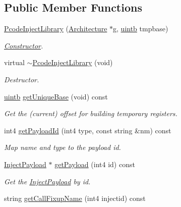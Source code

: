 \subsection*{Public Member Functions}
\begin{DoxyCompactItemize}
\item 
\mbox{\hyperlink{class_pcode_inject_library_a13fae9d7af655217a5612e4837d1f269}{Pcode\+Inject\+Library}} (\mbox{\hyperlink{class_architecture}{Architecture}} $\ast$g, \mbox{\hyperlink{types_8h_a2db313c5d32a12b01d26ac9b3bca178f}{uintb}} tmpbase)
\begin{DoxyCompactList}\small\item\em \mbox{\hyperlink{class_constructor}{Constructor}}. \end{DoxyCompactList}\item 
virtual \mbox{\hyperlink{class_pcode_inject_library_ae7a4417915e073736f49f698b95eb450}{$\sim$\+Pcode\+Inject\+Library}} (void)
\begin{DoxyCompactList}\small\item\em Destructor. \end{DoxyCompactList}\item 
\mbox{\hyperlink{types_8h_a2db313c5d32a12b01d26ac9b3bca178f}{uintb}} \mbox{\hyperlink{class_pcode_inject_library_a6ec47b3f3836fdd9116a9755ad1727c4}{get\+Unique\+Base}} (void) const
\begin{DoxyCompactList}\small\item\em Get the (current) offset for building temporary registers. \end{DoxyCompactList}\item 
int4 \mbox{\hyperlink{class_pcode_inject_library_ad49624d6aa508e6e75d7c23f9c839c02}{get\+Payload\+Id}} (int4 type, const string \&nm) const
\begin{DoxyCompactList}\small\item\em Map name and type to the payload id. \end{DoxyCompactList}\item 
\mbox{\hyperlink{class_inject_payload}{Inject\+Payload}} $\ast$ \mbox{\hyperlink{class_pcode_inject_library_a6075295c64a06ab05e954dc6f18945f9}{get\+Payload}} (int4 id) const
\begin{DoxyCompactList}\small\item\em Get the \mbox{\hyperlink{class_inject_payload}{Inject\+Payload}} by id. \end{DoxyCompactList}\item 
string \mbox{\hyperlink{class_pcode_inject_library_a436ac8db6c2f5735481c86a937d3db55}{get\+Call\+Fixup\+Name}} (int4 injectid) const

\end{DoxyCompactItemize}
